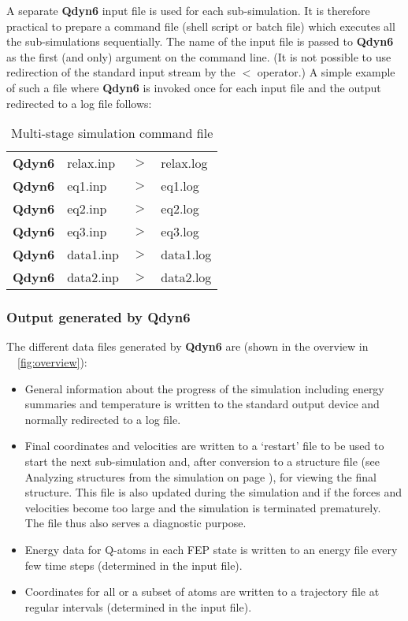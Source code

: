 \documentclass[a4paper,11pt]{article}
\let\origref\ref
\def\ref#1{\unskip~\origref{#1}}
\begin{document}
A separate \textbf{Qdyn6} input file is used for each sub-simulation. It is
therefore practical to prepare a command file (shell script or
batch file) which executes all the sub-simulations sequentially.
The name of the input file is passed to \textbf{Qdyn6} as the first (and
only) argument on the command line. (It is not possible to use
redirection of the standard input stream by the $<$ operator.) A
simple example of such a file where \textbf{Qdyn6} is invoked once for each
input file and the output redirected to a log file follows:

\begin{table}[htbp]
\begin{center}
\caption{Multi-stage simulation command file}
\begin{tabularx}{\textwidth}{|l l l X|}
  \hline
  \textbf{Qdyn6} & relax.inp & $>$ & relax.log \\
  \textbf{Qdyn6} & eq1.inp   & $>$ & eq1.log \\
  \textbf{Qdyn6} & eq2.inp   & $>$ & eq2.log \\
  \textbf{Qdyn6} & eq3.inp   & $>$ & eq3.log \\
  \textbf{Qdyn6} & data1.inp & $>$ & data1.log \\
  \textbf{Qdyn6} & data2.inp & $>$ & data2.log \\ \hline
\end{tabularx}
\end{center}
\end{table}

\subsubsection{Output generated by \textbf{Qdyn6}} The different data files
generated by \textbf{Qdyn6} are (shown in the overview in
\figurename~\ref{fig:overview}):

\begin{itemize}
\item General information about the progress of the simulation including
energy summaries and temperature is written to the standard output
device and normally redirected to a log file.
\item Final coordinates and velocities are written to a `restart' file to be
used to start the next sub-simulation and, after conversion to a
structure file (see Analyzing structures from the simulation on
page \pageref{subsubsec:Analyzing_struc_f_t_sim}), for viewing the
final structure. This file is also updated during the simulation
and if the forces and velocities become too large and the
simulation is terminated prematurely. The file thus also serves a
diagnostic purpose.
\item Energy data for Q-atoms in each FEP state is written to an
energy file every few time steps (determined in the input file).
\item Coordinates for all or a subset of atoms are written to a trajectory
file at regular intervals (determined in the input file).
\end{itemize}
\end{document}
